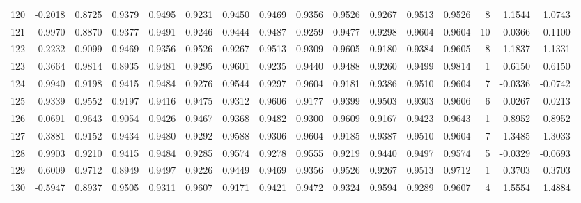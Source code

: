 \begin{tabular}{lrrrrrrrrrrrrrrr}
120 &     -0.2018 &  0.8725 &  0.9379 &  0.9495 &  0.9231 &  0.9450 &  0.9469 &  0.9356 &  0.9526 &  0.9267 &   0.9513 &     0.9526 &      8 &                    1.1544 &                     1.0743 \\
121 &      0.9970 &  0.8870 &  0.9377 &  0.9491 &  0.9246 &  0.9444 &  0.9487 &  0.9259 &  0.9477 &  0.9298 &   0.9604 &     0.9604 &     10 &                   -0.0366 &                    -0.1100 \\
122 &     -0.2232 &  0.9099 &  0.9469 &  0.9356 &  0.9526 &  0.9267 &  0.9513 &  0.9309 &  0.9605 &  0.9180 &   0.9384 &     0.9605 &      8 &                    1.1837 &                     1.1331 \\
123 &      0.3664 &  0.9814 &  0.8935 &  0.9481 &  0.9295 &  0.9601 &  0.9235 &  0.9440 &  0.9488 &  0.9260 &   0.9499 &     0.9814 &      1 &                    0.6150 &                     0.6150 \\
124 &      0.9940 &  0.9198 &  0.9415 &  0.9484 &  0.9276 &  0.9544 &  0.9297 &  0.9604 &  0.9181 &  0.9386 &   0.9510 &     0.9604 &      7 &                   -0.0336 &                    -0.0742 \\
125 &      0.9339 &  0.9552 &  0.9197 &  0.9416 &  0.9475 &  0.9312 &  0.9606 &  0.9177 &  0.9399 &  0.9503 &   0.9303 &     0.9606 &      6 &                    0.0267 &                     0.0213 \\
126 &      0.0691 &  0.9643 &  0.9054 &  0.9426 &  0.9467 &  0.9368 &  0.9482 &  0.9300 &  0.9609 &  0.9167 &   0.9423 &     0.9643 &      1 &                    0.8952 &                     0.8952 \\
127 &     -0.3881 &  0.9152 &  0.9434 &  0.9480 &  0.9292 &  0.9588 &  0.9306 &  0.9604 &  0.9185 &  0.9387 &   0.9510 &     0.9604 &      7 &                    1.3485 &                     1.3033 \\
128 &      0.9903 &  0.9210 &  0.9415 &  0.9484 &  0.9285 &  0.9574 &  0.9278 &  0.9555 &  0.9219 &  0.9440 &   0.9497 &     0.9574 &      5 &                   -0.0329 &                    -0.0693 \\
129 &      0.6009 &  0.9712 &  0.8949 &  0.9497 &  0.9226 &  0.9449 &  0.9469 &  0.9356 &  0.9526 &  0.9267 &   0.9513 &     0.9712 &      1 &                    0.3703 &                     0.3703 \\
130 &     -0.5947 &  0.8937 &  0.9505 &  0.9311 &  0.9607 &  0.9171 &  0.9421 &  0.9472 &  0.9324 &  0.9594 &   0.9289 &     0.9607 &      4 &                    1.5554 &                     1.4884 \\

\end{tabular}
